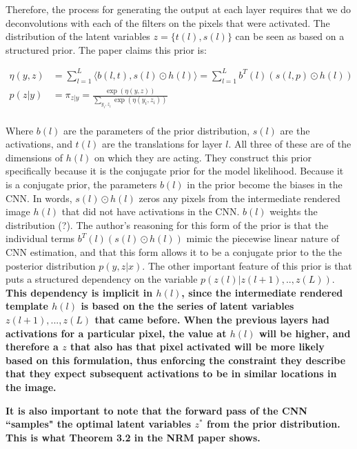 \documentclass{report}
\begin{document}
	Therefore, the process for generating the output at each layer requires that we do deconvolutions with each of the filters on the pixels that were activated. The distribution of the latent variables $z = \{t(l), s(l)\}$ can be seen as based on a structured prior. The paper claims this prior is:
	
	\begin{equation}
		\begin{split}
		\eta(y, z) &= \sum_{l=1}^{L} \langle b(l, t), s(l) \odot h(l) \rangle = \sum_{l=1}^{L} b^T(l)(s(l,p) \odot h(l))\\
	 	p(z | y) &= \pi_{z|y} = \frac{\exp \left(\eta(y, z)\right)}
	 	{\sum_{y_i, z_i}\exp\left(\eta(y_i, z_i)\right)} \\
	 	\end{split}
	\end{equation}

	Where $b(l)$ are the parameters of the prior distribution, $s(l)$ are the activations, and $t(l)$ are the translations for layer $l$. All three of these are of the dimensions of $h(l)$ on which they are acting. They construct this prior specifically because it is the conjugate prior for the model likelihood. Because it is a conjugate prior, the parameters $b(l)$ in the prior become the biases in the CNN.
	In words, $s(l) \odot h(l)$ zeros any pixels from the intermediate rendered image $h(l)$ that did not have activations in the CNN. $b(l)$ weights the distribution (?).  The author's reasoning for this form of the prior is that the individual terms $b^T(l)(s(l)\odot h(l))$ mimic the piecewise linear nature of CNN estimation, and that this form allows it to be a conjugate prior to the the posterior distribution $p(y, z | x)$. The other important feature of this prior is that puts a structured dependency on the variable $p(z(l) | z(l + 1), .., z(L))$. \textbf{This dependency is implicit in $h(l)$, since the intermediate rendered template $h(l)$ is based on the the series of latent variables $z(l + 1), ..., z(L)$ that came before. When the previous layers had activations for a particular pixel, the value at $h(l)$ will be higher, and therefore a $z$ that also has that pixel activated will be more likely based on this formulation, thus enforcing the constraint they describe that they expect subsequent activations to be in similar locations in the image.} 
	
	\textbf{It is also important to note that the forward pass of the CNN ``samples" the optimal latent variables $z^*$ from the prior distribution. This is what Theorem 3.2 in the NRM paper shows.}
	
\end{document}
